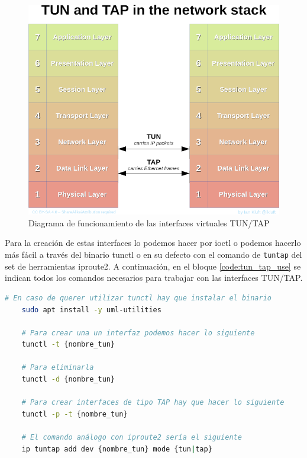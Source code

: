 \begin{figure}[ht]
    \centering
    \includegraphics[width=\textwidth]{archivos/img/teoria/linux1.png}
    \caption{Diagrama de funcionamiento de las interfaces virtuales TUN/TAP \cite{tuntap2}}
    \label{fig:linux1}
\end{figure}

Para la creación de estas interfaces lo podemos hacer por ioctl o podemos hacerlo más fácil a través del binario tunctl o en su defecto con el comando de \texttt{tuntap} del set de herramientas iproute2. A continuación, en el bloque \ref{code:tun_tap_use} se indican todos los comandos necesarios para trabajar con las interfaces TUN/TAP.

\begin{lstlisting}[language= bash, style=Consola, caption={Manejo de interfaces TUN - TAP},label=code:tun_tap_use]
    # En caso de querer utilizar tunctl hay que instalar el binario
    sudo apt install -y uml-utilities
    
    # Para crear una un interfaz podemos hacer lo siguiente
    tunctl -t {nombre_tun}

    # Para eliminarla
    tunctl -d {nombre_tun}

    # Para crear interfaces de tipo TAP hay que hacer lo siguiente
    tunctl -p -t {nombre_tun}
    
    # El comando análogo con iproute2 sería el siguiente
    ip tuntap add dev {nombre_tun} mode {tun|tap}
\end{lstlisting}
\vspace{0.5cm}

